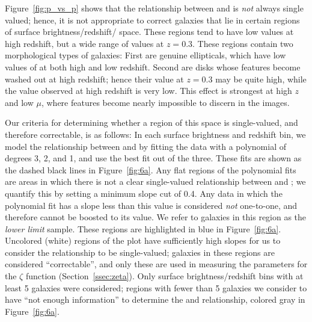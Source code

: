 \documentclass[twocolumn]{aastex6}
\begin{document}
Figure~\ref{fig:p_vs_p} shows that the relationship between \pfeaturesz{} and \pfeaturesrest{} is \emph{not} always single valued; hence, it is not appropriate to correct galaxies that lie in certain regions of surface brightness/redshift/\pfeatures{} space. These regions tend to have low \pfeatures{} values at high redshift, but a wide range of values at $z=0.3$. These regions contain two morphological types of galaxies: First are genuine ellipticals, which have low values of \pfeatures{} at both high and low redshift. Second are disks whose features become washed out at high redshift; hence their \pfeatures{} value at $z=0.3$ may be quite high, while the value observed at high redshift is very low. This effect is strongest at high $z$ and low $\mu$, where features become nearly impossible to discern in the images.

Our criteria for determining whether a region of this space is single-valued, and therefore correctable, is as follows: In each surface brightness and redshift bin, we model the relationship between \pfeaturesz{} and \pfeaturesrest{} by fitting the data with a polynomial of degrees 3, 2, and 1, and use the best fit out of the three. These fits are shown as the dashed black lines in Figure~\ref{fig:6a}. Any flat regions of the polynomial fits are areas in which there is not a clear single-valued relationship between \pfeaturesz{} and \pfeaturesrest; we quantify this by setting a minimum slope cut of 0.4. Any data in which the polynomial fit has a slope less than this value is considered \emph{not} one-to-one, and therefore \pfeaturesz{} cannot be boosted to its \pfeaturesrest{} value. We refer to galaxies in this region as the \emph{lower limit} sample. These regions are highlighted in blue in Figure~\ref{fig:6a}. Uncolored (white) regions of the plot have sufficiently high slopes for us to consider the relationship to be single-valued; galaxies in these regions are considered ``correctable'', and only these are used in measuring the parameters for the $\zeta$ function (Section~\ref{ssec:zeta}). Only surface brightness/redshift bins with at least 5 galaxies were considered; regions with fewer than 5 galaxies we consider to have ``not enough information'' to determine the \pfeaturesz{} and \pfeaturesrest{} relationship, colored gray in Figure~\ref{fig:6a}.
\end{document}
